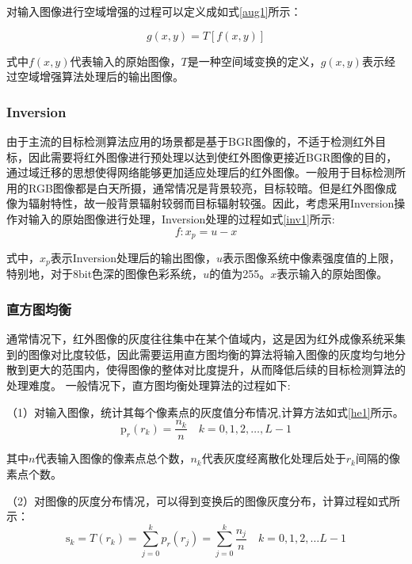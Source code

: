 对输入图像进行空域增强的过程可以定义成如式\ref{aug1}所示：

\begin{equation}
  g(x, y)=T[f(x, y)]
  \label{aug1}
\end{equation}

式中$f(x, y)$代表输入的原始图像，$T$是一种空间域变换的定义，$g(x, y)$表示经过空域增强算法处理后的输出图像。

\subsubsection{Inversion}
由于主流的目标检测算法应用的场景都是基于BGR图像的，不适于检测红外目标，因此需要将红外图像进行预处理以达到使红外图像更接近BGR图像的目的，通过域迁移的思想使得网络能够更加适应处理后的红外图像。一般用于目标检测所用的RGB图像都是白天所摄，通常情况是背景较亮，目标较暗。但是红外图像成像为辐射特性，故一般背景辐射较弱而目标辐射较强。因此，考虑采用Inversion操作对输入的原始图像进行处理，Inversion处理的过程如式\ref{inv1}所示:
\begin{equation}
  f: x_{p}=u-x
  \label{inv1}
\end{equation}

式中，$x_{p}$表示Inversion处理后的输出图像，$u$表示图像系统中像素强度值的上限，特别地，对于8bit色深的图像色彩系统，$u$的值为255。$x$表示输入的原始图像。

\subsubsection{直方图均衡}
通常情况下，红外图像的灰度往往集中在某个值域内，这是因为红外成像系统采集到的图像对比度较低，因此需要运用直方图均衡的算法将输入图像的灰度均匀地分散到更大的范围内，使得图像的整体对比度提升，从而降低后续的目标检测算法的处理难度。
一般情况下，直方图均衡处理算法的过程如下: 

（1）对输入图像，统计其每个像素点的灰度值分布情况,计算方法如式\ref{he1}所示。
\begin{equation}
  \mathrm{p}_{r}\left(r_{k}\right)=\frac{n_{k}}{n} \quad k=0,1,2, \ldots, L-1
  \label{he1}
\end{equation}

其中$n$代表输入图像的像素点总个数，$n_{k}$代表灰度经离散化处理后处于$r_{k}$间隔的像素点个数。

（2）对图像的灰度分布情况，可以得到变换后的图像灰度分布，计算过程如式\label{pix trans}所示：
\begin{equation}
  \mathrm{s}_{k}=T\left(r_{k}\right)=\sum_{j=0}^{k} p_{r}\left(r_{j}\right)=\sum_{j=0}^{k} \frac{n_{j}}{n} \quad k=0,1,2, \ldots L-1
  \label{pix trans}
\end{equation}


